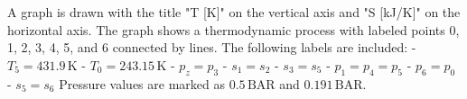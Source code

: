 A graph is drawn with the title "T [K]" on the vertical axis and "S [kJ/K]" on the horizontal axis. The graph shows a thermodynamic process with labeled points 0, 1, 2, 3, 4, 5, and 6 connected by lines. The following labels are included:  
- \( T_5 = 431.9 \, \text{K} \)  
- \( T_0 = 243.15 \, \text{K} \)  
- \( p_z = p_3 \)  
- \( s_1 = s_2 \)  
- \( s_3 = s_5 \)  
- \( p_1 = p_4 = p_5 \)  
- \( p_6 = p_0 \)  
- \( s_5 = s_6 \)  
Pressure values are marked as \( 0.5 \, \text{BAR} \) and \( 0.191 \, \text{BAR} \).